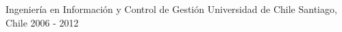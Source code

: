 

\begin{cventries}

  \cventry
    {Ingeniería en Información y Control de Gestión} %
    {Universidad de Chile} %
    {Santiago, Chile} %
    {2006 - 2012} %
    {}


\end{cventries}
